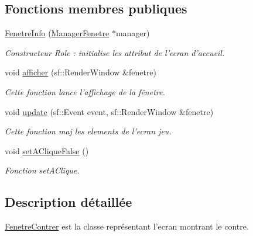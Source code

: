 \subsection*{\-Fonctions membres publiques}
\begin{DoxyCompactItemize}
\item 
\hypertarget{classFenetreInfo_aa5ad837d6d17760f287e272e3adf5278}{\hyperlink{classFenetreInfo_aa5ad837d6d17760f287e272e3adf5278}{\-Fenetre\-Info} (\hyperlink{classManagerFenetre}{\-Manager\-Fenetre} $\ast$manager)}\label{classFenetreInfo_aa5ad837d6d17760f287e272e3adf5278}

\begin{DoxyCompactList}\small\item\em \-Constructeur \-Role \-: initialise les attribut de l'ecran d'accueil. \end{DoxyCompactList}\item 
void \hyperlink{classFenetreInfo_aa44271e51b95de0c49dcf05ec655927f}{afficher} (sf\-::\-Render\-Window \&fenetre)
\begin{DoxyCompactList}\small\item\em \-Cette fonction lance l'affichage de la fênetre. \end{DoxyCompactList}\item 
void \hyperlink{classFenetreInfo_a5113582738da07d64a85c2a10eb853f0}{update} (sf\-::\-Event event, sf\-::\-Render\-Window \&fenetre)
\begin{DoxyCompactList}\small\item\em \-Cette fonction maj les elements de l'ecran jeu. \end{DoxyCompactList}\item 
\hypertarget{classFenetreInfo_a14568d1613f5d861aeefa40eab62bfcf}{void \hyperlink{classFenetreInfo_a14568d1613f5d861aeefa40eab62bfcf}{set\-A\-Clique\-False} ()}\label{classFenetreInfo_a14568d1613f5d861aeefa40eab62bfcf}

\begin{DoxyCompactList}\small\item\em \-Fonction set\-A\-Clique. \end{DoxyCompactList}\end{DoxyCompactItemize}


\subsection{\-Description détaillée}
\hyperlink{classFenetreContrer}{\-Fenetre\-Contrer} est la classe représentant l'ecran montrant le contre. 

